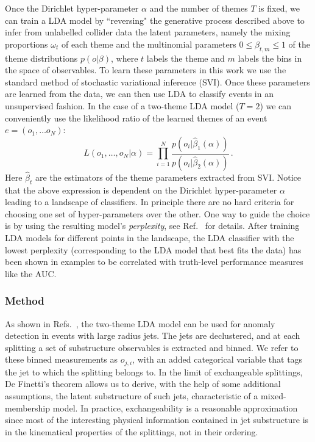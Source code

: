 \documentclass[a4paper,11pt]{article}
\begin{document}
Once the Dirichlet hyper-parameter $\alpha$ and the number of themes $T$ is fixed, we can train a LDA model by ``reversing" the generative process described above to infer from unlabelled collider data the latent parameters, namely the mixing proportions $\omega_t$ of each theme and the multinomial parameters $0\le \beta_{t,m}\le 1$ of the theme distributions $p(o|\beta)$, where $t$ labels the theme and $m$ labels the bins in the space of observables. To learn these parameters in this work we use the standard method of stochastic variational inference (SVI). Once these parameters are learned from the data, we can then use LDA to classify events in an unsupervised fashion. In the case of a two-theme LDA  model ($T=2$) we can conveniently use the likelihood ratio of the learned themes of an event $e=(o_1,\ldots o_N)$:
\[
L(o_1,\ldots, o_N|\alpha)=\prod_{i=1}^N\frac{p(o_{i}|\hat\beta_1(\alpha))}{p(o_{i}|\hat\beta_2(\alpha))}\,.
\] 
Here $\hat \beta_t$ are the estimators of the theme parameters extracted from SVI. 
Notice that the above expression is dependent on the Dirichlet hyper-parameter $\alpha$ leading to a landscape of classifiers.  In principle there are no hard criteria for choosing one set of hyper-parameters over the other. One way to guide the choice is by using the resulting model's {\it perplexity}, see Ref.~\cite{1797846} for details. After training LDA models for different points in the landscape, the LDA classifier with the lowest perplexity (corresponding to the LDA model that best fits the data) has been shown in examples to be correlated with truth-level performance measures like the AUC. 



\subsubsection{Method}
\label{sec:method}

As shown in Refs.~\cite{Dillon:2019cqt, 1797846}, the two-theme LDA model can be used for anomaly detection in events with large radius jets. The jets are declustered, and at each splitting a set of substructure observables is extracted and binned. We refer to these binned measurements as $o_{j,i}$, with an added categorical variable that tags the jet to which the splitting belongs to. 
In the limit of exchangeable splittings, De Finetti's theorem allows us to derive, with the help of some additional assumptions, the latent substructure of such jets, characteristic of a mixed-membership model. In practice, exchangeability is a reasonable approximation since most of the interesting physical information contained in jet substructure is in the kinematical properties of the splittings, not in their ordering.
\end{document}
